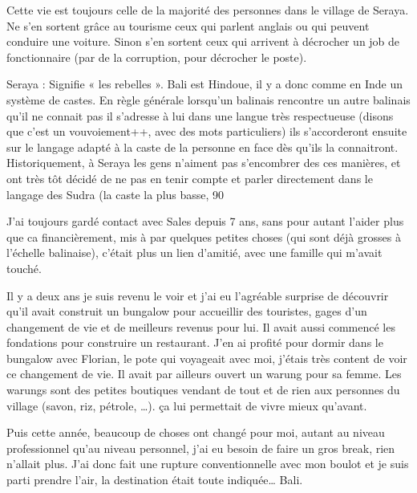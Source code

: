 Cette vie est toujours celle de la majorité des personnes dans le village de Seraya. Ne s’en sortent grâce au tourisme ceux qui parlent anglais ou qui peuvent conduire une voiture. Sinon s’en sortent ceux qui arrivent à décrocher un job de fonctionnaire (par de la corruption, pour décrocher le poste).

Seraya : Signifie « les rebelles ». Bali est Hindoue, il y a donc comme en Inde un système de castes. En règle générale lorsqu’un balinais rencontre un autre balinais qu’il ne connait pas il s’adresse à lui dans une langue très respectueuse (disons que c’est un vouvoiement++, avec des mots particuliers) ils s’accorderont ensuite sur le langage adapté à la caste de la personne en face dès qu’ils la connaitront. Historiquement, à Seraya les gens n’aiment pas s’encombrer des ces manières, et ont très tôt décidé de ne pas en tenir compte et parler directement dans le langage des Sudra (la caste la plus basse, 90%

J’ai toujours gardé contact avec Sales depuis 7 ans, sans pour autant l’aider plus que ca financièrement, mis à par quelques petites choses (qui sont déjà grosses à l’échelle balinaise), c’était plus un lien d’amitié, avec une famille qui m’avait touché.

Il y a deux ans je suis revenu le voir et j’ai eu l’agréable surprise de découvrir qu’il avait construit un bungalow pour accueillir des touristes, gages d’un changement de vie et de meilleurs revenus pour lui. Il avait aussi commencé les fondations pour construire un restaurant. J’en ai profité pour dormir dans le bungalow avec Florian, le pote qui voyageait avec moi, j’étais très content de voir ce changement de vie. Il avait par ailleurs ouvert un warung pour sa femme. Les warungs sont des petites boutiques vendant de tout et de rien aux personnes du village (savon, riz, pétrole, …). ça lui permettait de vivre mieux qu’avant.

Puis cette année, beaucoup de choses ont changé pour moi, autant au niveau professionnel qu’au niveau personnel, j’ai eu besoin de faire un gros break, rien n’allait plus. J’ai donc fait une rupture conventionnelle avec mon boulot et je suis parti prendre l’air, la destination était toute indiquée… Bali.

